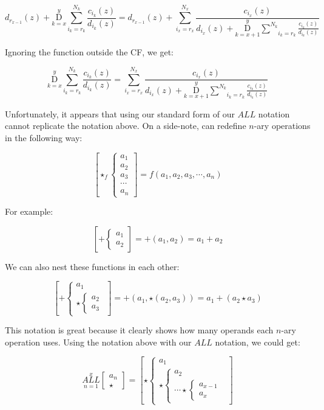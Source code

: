 \documentclass{article}
\begin{document}
$$d_{r_{x-1}}(z) + \underset{k=x}{\overset{y}{ \mathrm D}} \underset{i_k=r_k}{\overset{N_k}{ \sum}} \frac{c_{i_k} (z)}{d_{i_k} (z)} = d_{r_{x-1}}(z)+ \underset{i_x=r_x}{\overset{N_x}{ \sum}} \frac{c_{i_x}(z)}{d_{i_x}(z)+ \underset{k=x+1}{\overset{y}{ \mathrm D}} \underset{i_k=r_k}{\overset{N_k}{ \sum}} \frac{c_{i_k} (z)}{d_{i_k} (z)}}$$

Ignoring the function outside the CF, we get:

$$\underset{k=x}{\overset{y}{ \mathrm D}} \underset{i_k=r_k}{\overset{N_k}{ \sum}} \frac{c_{i_k} (z)}{d_{i_k} (z)} = \underset{i_x=r_x}{\overset{N_x}{ \sum}} \frac{c_{i_x}(z)}{d_{i_x}(z)+ \underset{k=x+1}{\overset{y}{ \mathrm D}} \underset{i_k=r_k}{\overset{N_k}{ \sum}} \frac{c_{i_k} (z)}{d_{i_k} (z)}}$$

Unfortunately, it appears that using our standard form of our $ALL$ notation cannot replicate the notation above. On a side-note, can redefine $n$-ary operations in the following way:

$$\left[ \star_f \left\{ \begin{array}{rcl}
a_1 \\ a_2 \\ a_3 \\ \cdots \\ a_n
\end{array}\right. \right] = f(a_1, a_2, a_3, \cdots, a_n)$$

For example:

$$\left[ + \left\{ \begin{array}{rcl}
a_1 \\ a_2 \end{array}\right. \right] = +(a_1,a_2)=a_1+a_2$$

We can also nest these functions in each other:

$$\left[ + \left\{ \begin{array}{rcl}
a_1 \\ \star \left\{  \begin{array} {rcl} a_2 \\ a_3\end{array} \right. \end{array}\right. \right] = +(a_1,\star(a_2,a_3))=a_1+(a_2 \star a_3)$$

This notation is great because it clearly shows how many operands each $n$-ary operation uses. Using the notation above with our $ALL$ notation, we could get:

$$\underset{n=1}{\overset{x}{ALL}} \begin{bmatrix}
a_n \\
\star
\end{bmatrix}=\left[ \star \left\{ \begin{array}{rcl}
a_1 \\ \star \left\{  \begin{array} {rcl} a_2 \\ \cdots  \star \left\{ \begin{array}{rcl}
a_{x-1} \\ a_x \end{array} \right. \end{array} \right. \end{array}\right. \right]$$
\end{document}
